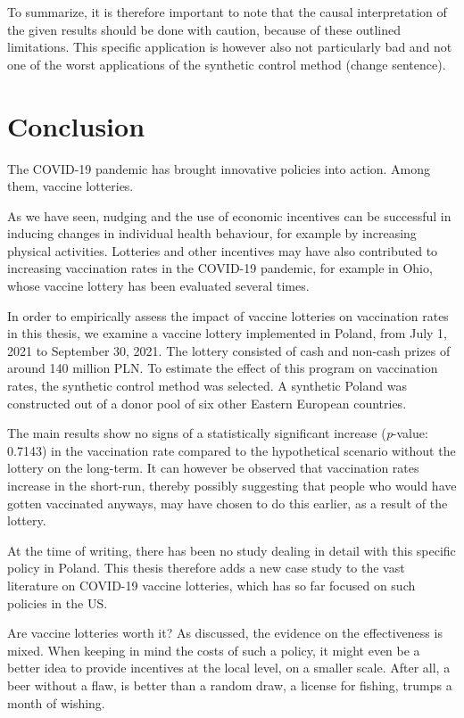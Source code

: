 \documentclass{scrbook}
\begin{document}
To summarize, it is therefore important to note that the causal
interpretation of the given results should be done with caution, because
of these outlined limitations. This specific application is however also
not particularly bad and not one of the worst applications of the
synthetic control method (change sentence).

\chapter{Conclusion}

The COVID-19 pandemic has brought innovative policies into action. Among
them, vaccine lotteries.

As we have seen, nudging and the use of economic incentives can be
successful in inducing changes in individual health behaviour, for
example by increasing physical activities. Lotteries and other
incentives may have also contributed to increasing vaccination rates in
the COVID-19 pandemic, for example in Ohio, whose vaccine lottery has
been evaluated several times.

In order to empirically assess the impact of vaccine lotteries on
vaccination rates in this thesis, we examine a vaccine lottery
implemented in Poland, from July 1, 2021 to September 30, 2021. The
lottery consisted of cash and non-cash prizes of around 140 million PLN.
To estimate the effect of this program on vaccination rates, the
synthetic control method was selected. A synthetic Poland was
constructed out of a donor pool of six other Eastern European countries.

The main results show no signs of a statistically significant increase
(\textit{p}-value: 0.7143) in the vaccination rate compared to the
hypothetical scenario without the lottery on the long-term. It can
however be observed that vaccination rates increase in the short-run,
thereby possibly suggesting that people who would have gotten vaccinated
anyways, may have chosen to do this earlier, as a result of the lottery.

At the time of writing, there has been no study dealing in detail with
this specific policy in Poland. This thesis therefore adds a new case
study to the vast literature on COVID-19 vaccine lotteries, which has so
far focused on such policies in the US.

Are vaccine lotteries worth it? As discussed, the evidence on the
effectiveness is mixed. When keeping in mind the costs of such a policy,
it might even be a better idea to provide incentives at the local level,
on a smaller scale. After all, a beer without a flaw, is better than a
random draw, a license for fishing, trumps a month of wishing.
\end{document}
